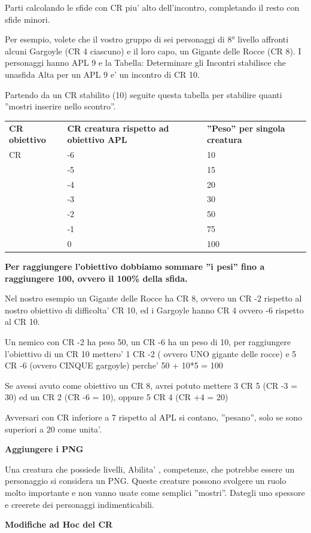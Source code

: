 \documentclass[a4paper,11pt,twoside,openany]{book}
\begin{document}
Parti calcolando le sfide con CR piu' alto dell'incontro, completando il resto con sfide minori.

Per esempio, volete che il vostro gruppo di sei personaggi di 8° livello affronti alcuni Gargoyle (CR 4 ciascuno) e il loro capo, un Gigante delle Rocce (CR 8). I personaggi hanno APL 9 e la Tabella: Determinare gli Incontri stabilisce che unasfida Alta per un APL 9 e' un incontro di CR 10.

Partendo da un CR stabilito (10) seguite questa tabella per stabilire quanti ''mostri inserire nello scontro''.

\bigskip

\begin{tabular}{lll}
\toprule
\textbf{CR obiettivo} & \textbf{CR creatura rispetto ad obiettivo APL} & \textbf{''Peso'' per singola creatura}\tabularnewline
CR & -6 & 10\tabularnewline
 & -5 & 15\tabularnewline
 & -4 & 20\tabularnewline
 & -3 & 30\tabularnewline
 & -2 & 50\tabularnewline
 & -1 & 75\tabularnewline
 & 0 & 100\tabularnewline
\end{tabular}

\bigskip

\textbf{Per raggiungere l'obiettivo dobbiamo sommare ''i pesi''
fino a raggiungere 100, ovvero il 100\% della sfida.}

Nel nostro esempio un Gigante delle Rocce ha CR 8, ovvero un CR -2 rispetto al nostro obiettivo di difficolta' CR 10, ed i Gargoyle hanno CR 4 ovvero -6 rispetto al CR 10.

Un nemico con CR -2 ha peso 50, un CR -6 ha un peso di 10, per raggiungere l'obiettivo di un CR 10 mettero' 1 CR -2 ( ovvero UNO gigante delle rocce) e 5 CR -6 (ovvero CINQUE gargoyle) perche' 50 + 10{*}5 = 100

Se avessi avuto come obiettivo un CR 8, avrei potuto mettere 3 CR 5 (CR -3 = 30) ed un CR 2 (CR -6 = 10), oppure 5 CR 4 (CR +4 = 20)

Avversari con CR inferiore a 7 rispetto al APL si contano, ''pesano'', solo se sono superiori a 20 come unita'.

\textbf{Aggiungere i PNG}

Una creatura che possiede livelli, Abilita' , competenze, che potrebbe essere un personaggio si considera un PNG. Queste creature possono svolgere un ruolo molto importante e non vanno usate come semplici ''mostri''. Dategli uno spessore e creerete dei personaggi indimenticabili.

\textbf{Modifiche ad Hoc del CR}
\end{document}
